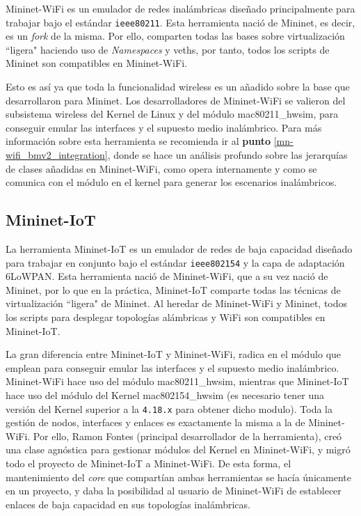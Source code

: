 Mininet-WiFi \cite{7367387} es un emulador de redes inalámbricas diseñado principalmente para trabajar bajo el estándar \texttt{ieee80211}. Esta herramienta nació de Mininet, es decir, es un \textit{fork} de la misma. Por ello, comparten todas las bases sobre virtualización ``ligera" haciendo uso de \textit{Namespaces} y \gls{veth}s, por tanto, todos los scripts de Mininet son compatibles en Mininet-WiFi. \\
\par
Esto es así ya que toda la funcionalidad wireless es un añadido sobre la base que desarrollaron para Mininet. Los desarrolladores de Mininet-WiFi se valieron del subsistema wireless del Kernel de Linux y del módulo mac80211\_hwsim, para conseguir emular las interfaces y el supuesto medio inalámbrico. Para más información sobre esta herramienta se recomienda ir al \textbf{punto} \ref{mn-wifi_bmv2_integration}, donde se hace un análisis profundo sobre las jerarquías de clases añadidas en Mininet-WiFi, como opera internamente y como se comunica con el módulo en el kernel para generar los escenarios inalámbricos.



\subsection{Mininet-IoT}
\label{mininetIoT}

La herramienta Mininet-IoT \cite{mininetIOT} es un emulador de redes de baja capacidad diseñado para trabajar en conjunto bajo el estándar \texttt{ieee802154} y la capa de adaptación 6LoWPAN. Esta herramienta nació de Mininet-WiFi, que a su vez nació de Mininet, por lo que en la práctica, Mininet-IoT comparte todas las técnicas de virtualización ``ligera" de Mininet. Al heredar de Mininet-WiFi y Mininet, todos los scripts para desplegar topologías alámbricas y WiFi son compatibles en Mininet-IoT.  \\
\par

La gran diferencia entre Mininet-IoT y Mininet-WiFi, radica en el módulo que emplean para conseguir emular las interfaces y el supuesto medio inalámbrico. Mininet-WiFi hace uso del módulo mac80211\_hwsim, mientras que Mininet-IoT hace uso del módulo del Kernel mac802154\_hwsim (es necesario tener una versión del Kernel superior a la \texttt{4.18.x} para obtener dicho modulo). Toda la gestión de nodos, interfaces y enlaces es exactamente la misma a la de Mininet-WiFi. Por ello, Ramon Fontes (principal desarrollador de la herramienta), creó una clase agnóstica para gestionar módulos del Kernel en Mininet-WiFi, y migró todo el proyecto de Mininet-IoT a Mininet-WiFi. De esta forma, el mantenimiento del \textit{core} que compartían ambas herramientas se hacía únicamente en un proyecto, y daba la posibilidad al usuario de Mininet-WiFi de establecer enlaces de baja capacidad en sus topologías inalámbricas.